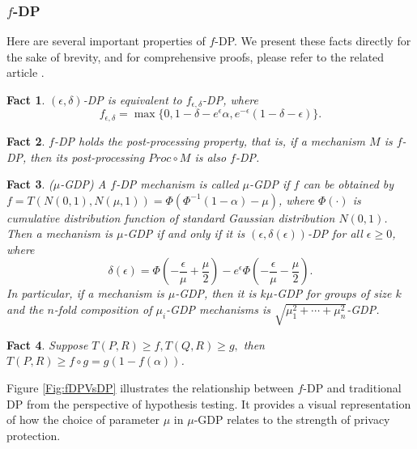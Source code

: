\documentclass[letterpaper]{article} %
\newtheorem{fact}{Fact}
\begin{document}
\subsubsection{$f$-DP}
Here are several important properties of $f$-DP. We present these facts directly for the sake of brevity, and for comprehensive proofs, please refer to the related article \cite{Dong2022gaussian}.
\begin{fact}\label{factfunc}
$(\epsilon,\delta)$-DP is equivalent to $f_{\epsilon,\delta}$-DP, where
\begin{equation}
f_{\epsilon,\delta} = \max\{0,1-\delta-e^{\epsilon}\alpha,e^{-\epsilon}(1-\delta-\epsilon) \}.
\end{equation}
\end{fact}
\begin{fact}
$f$-DP holds the post-processing property, that is, if a mechanism $M$ is $f$-DP, then its post-processing $Proc \circ M$ is also $f$-DP.
\end{fact}
\begin{fact}\label{muexpand}($\mu$-GDP)
A $f$-DP mechanism is called $\mu$-GDP if $f$ can be obtained by $f=T(N(0,1),N(\mu,1))=\Phi(\Phi^{-1}(1-\alpha)-\mu)$, where $\Phi(\cdot)$ is cumulative distribution function of standard Gaussian distribution $N(0,1)$.
 Then a mechanism is $\mu$-GDP if and only if it is $(\epsilon,\delta(\epsilon))$-DP for all $\epsilon \ge 0$, where $$
\delta(\epsilon)=\Phi(-\frac{\epsilon}{\mu}+\frac{\mu}{2})
-e^{\epsilon}\Phi(-\frac{\epsilon}{\mu}-\frac{\mu}{2}).
$$
 In
particular, if a mechanism is $\mu$-GDP, then it is $k\mu$-GDP for groups of size $k$ and the $n$-fold composition of $\mu_i$-GDP mechanisms is
$\sqrt{\mu_1^2+ \cdots + \mu_n^2}$-GDP.
\end{fact}
\begin{fact}
Suppose $T(P,R) \ge f, T(Q,R) \ge g,$ then $T(P,R) \ge f \circ g = g(1-f(\alpha))$.
\end{fact}
 Figure \ref{Fig:fDPVsDP}
 \cite{Dong2022gaussian} illustrates the relationship between $f$-DP and traditional DP from the perspective of hypothesis testing. It provides a visual representation of how the choice of parameter $\mu$ in $\mu$-GDP relates to the strength of privacy protection.
\end{document}
